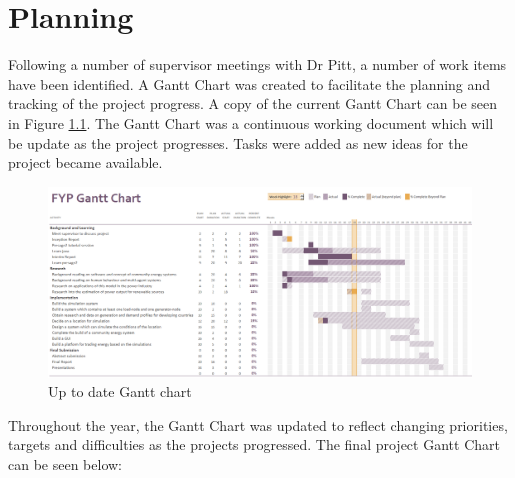 \chapter{Planning}
\label{Planning}
Following a number of supervisor meetings with Dr Pitt, a number of work items have been identified. A Gantt Chart was created to facilitate the planning and tracking of the project progress. A copy of the current Gantt Chart can be seen in Figure \ref{fig:GanttChart}. The Gantt Chart was a continuous working document which will be update as the project progresses. Tasks were added as new ideas for the project became available. 

\begin{figure}[h!]
\centering
\includegraphics[scale=0.5, angle=90]{Images/GanttChart.png}
\caption{Up to date Gantt chart}
\label{fig:GanttChart}
\end{figure}

Throughout the year, the Gantt Chart was updated to reflect changing priorities, targets and difficulties as the projects progressed. The final project Gantt Chart can be seen below:
